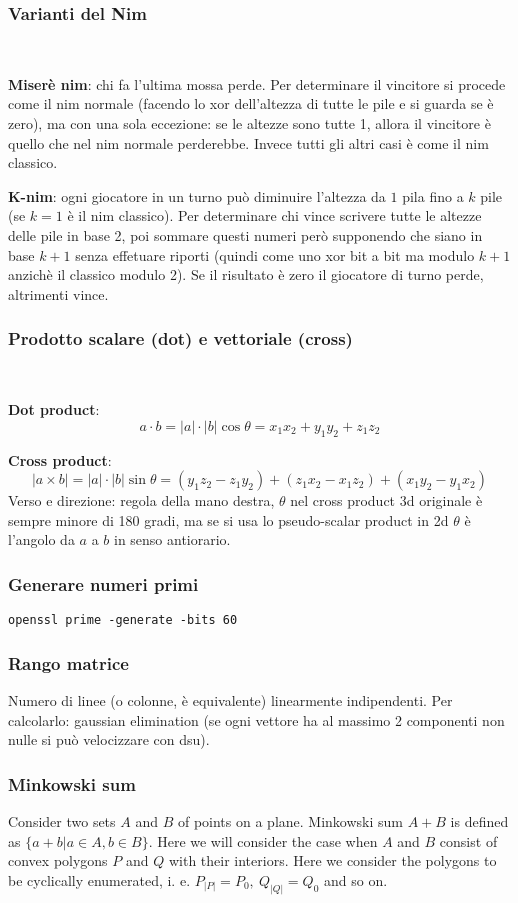 \subsubsection{Varianti del Nim} 
\,

\textbf{Miserè nim}: chi fa l'ultima mossa perde. Per determinare il vincitore si procede come il nim normale (facendo lo xor dell'altezza di tutte le pile e si guarda se è zero), ma con una sola eccezione: se le altezze sono tutte 1, allora il vincitore è quello che nel nim normale perderebbe. Invece tutti gli altri casi è come il nim classico.

\textbf{K-nim}: ogni giocatore in un turno può diminuire l'altezza da $1$ pila fino a $k$ pile (se $k=1$ è il nim classico). Per determinare chi vince scrivere tutte le altezze delle pile in base 2, poi sommare questi numeri però supponendo che siano in base $k+1$ senza effetuare riporti (quindi come uno xor bit a bit ma modulo $k+1$ anzichè il classico modulo 2). Se il risultato è zero il giocatore di turno perde, altrimenti vince.

\subsubsection{Prodotto scalare (dot) e vettoriale (cross)} 
\,

\textbf{Dot product}: 
$$a\cdot b = |a| \cdot |b| \cos \theta = x_1 x_2 + y_1 y_2 + z_1 z_2$$

\textbf{Cross product}:  
$$|a\times b| = |a| \cdot |b| \sin \theta = (y_1 z_2 - z_1 y_2) + (z_1 x_2 - x_1 z_2) + (x_1 y_2 - y_1 x_2)$$ 
Verso e direzione: regola della mano destra, $\theta$ nel cross product 3d originale è sempre minore di 180 gradi, ma se si usa lo pseudo-scalar product in 2d $\theta$ è l'angolo da $a$ a $b$ in senso antiorario.

\subsubsection{Generare numeri primi}\verb|openssl prime -generate -bits 60|

\subsubsection{Rango matrice}
Numero di linee (o colonne, è equivalente) linearmente indipendenti. Per calcolarlo: gaussian elimination (se ogni vettore ha al massimo 2 componenti non nulle si può velocizzare con dsu).

\subsubsection{Minkowski sum}
Consider two sets $A$ and $B$ of points on a plane. Minkowski sum $A + B$ is defined as $\{a + b| a \in A, b \in B\}$.
Here we will consider the case when $A$ and $B$ consist of convex polygons $P$ and $Q$ with their interiors.
Here we consider the polygons to be cyclically enumerated, i. e. $P_{|P|} = P_0,\ Q_{|Q|} = Q_0$ and so on.

